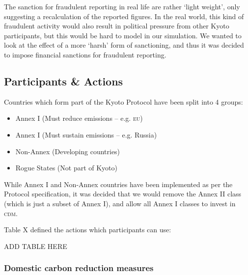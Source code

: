 \begin{description}
The sanction for fraudulent reporting in real life are rather `light weight', only suggesting a recalculation of the reported figures. In the real world, this kind of fraudulent activity would also result in political pressure from other Kyoto participants, but this would be hard to model in our simulation. We wanted to look at the effect of a more `harsh' form of sanctioning, and thus it was decided to impose financial sanctions for fraudulent reporting.
\end{description}

\subsection{Participants \& Actions}
Countries which form part of the Kyoto Protocol have been split into 4 groups:

\begin{itemize}
	\item{Annex I (Must reduce emissions -- e.g. \textsc{eu})}
	\item{Annex I (Must sustain emissions -- e.g. Russia)}
	\item{Non-Annex (Developing countries)}
	\item{Rogue States (Not part of Kyoto)}
\end{itemize}

While Annex I and Non-Annex countries have been implemented as per the Protocol specification, it was decided that we would remove the Annex II class (which is just a subset of Annex I), and allow all Annex I classes to invest in \textsc{cdm}.

Table X defined the actions which participants can use:

\begin{center}
ADD TABLE HERE
\end{center}

\subsubsection{Domestic carbon reduction measures}

